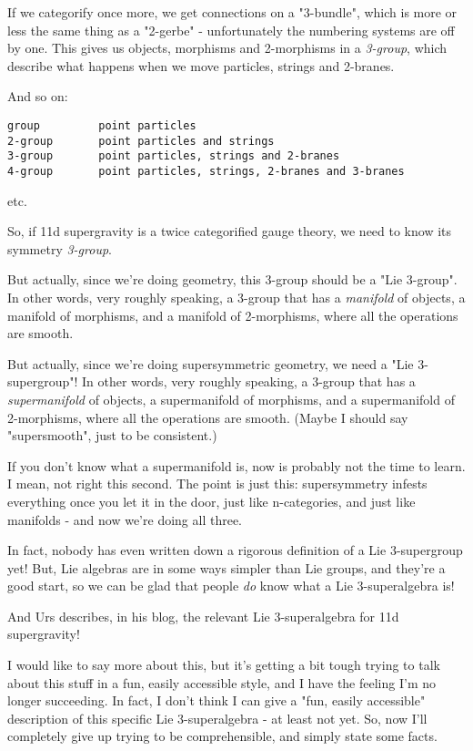 If we categorify once more, we get connections on a "3-bundle",
which is more or less the same thing as a "2-gerbe" - unfortunately
the numbering systems are off by one.   This gives us objects,
morphisms and 2-morphisms in a \emph{3-group}, which describe what 
happens when we move particles, strings and 2-branes.

And so on:

\begin{verbatim}
group         point particles
2-group       point particles and strings
3-group       point particles, strings and 2-branes
4-group       point particles, strings, 2-branes and 3-branes
\end{verbatim}
    
etc.  

So, if 11d supergravity is a twice categorified gauge theory,
we need to know its symmetry \emph{3-group}.  

But actually, since we're doing geometry, this 3-group should
be a "Lie 3-group".  In other words, very roughly speaking, 
a 3-group that has a \emph{manifold} of objects, a manifold of 
morphisms, and a manifold of 2-morphisms, where all the 
operations are smooth.

But actually, since we're doing supersymmetric geometry, we
need a "Lie 3-supergroup"!  In other words, very roughly
speaking, a 3-group that has a \emph{supermanifold} of objects, 
a supermanifold of morphisms, and a supermanifold of 2-morphisms, 
where all the operations are smooth.  (Maybe I should say 
"supersmooth", just to be consistent.)

If you don't know what a supermanifold is, now is probably 
not the time to learn.  I mean, not right this second.
The point is just this: supersymmetry 
infests everything once you let it in the door, just like 
n-categories, and just like manifolds - and now we're doing all three.   

In fact, nobody has even written down a rigorous definition
of a Lie 3-supergroup yet!  But, Lie algebras are in some ways 
simpler than Lie groups, and they're a good start, so we can
be glad that people \emph{do} know what a Lie 3-superalgebra is!

And Urs describes, in his blog, the relevant Lie 3-superalgebra
for 11d supergravity!

I would like to say more about this, but it's getting a bit 
tough trying to talk about this stuff in a fun, easily accessible 
style, and I have the feeling I'm no longer succeeding.  In fact,
I don't think I can give a "fun, easily accessible" description 
of this specific Lie 3-superalgebra - at least not yet.  So, 
now I'll completely give up trying to be comprehensible, and simply 
state some facts.

